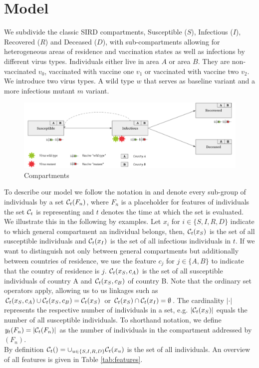 \section{Model}
We subdivide the classic SIRD compartments, Susceptible ($S$), Infectious ($I$), Recovered ($R$) and Deceased ($D$), with sub-compartments allowing for heterogeneous areas of residence and vaccination states as well as infections by different virus types. Individuals either live in area $A$ or area $B$. They are non-vaccinated $v_0$, vaccinated with vaccine one $v_1$ or vaccinated with vaccine two $v_2$. We introduce two virus types. A wild type $w$ that serves as baseline variant and a more infectious mutant $m$ variant.
\begin{figure}[h!]
\centering
\includegraphics[scale=0.23]{images/vaccination_pp.png}
\caption{Compartments }
\end{figure}
To describe our model we follow the notation in \cite{Waites.2021} and denote every sub-group of individuals by a set $\mathcal{C}_t(F_n)$, where $F_n$ is a placeholder for features of individuals the set $\mathcal{C}_t$ is representing and $t$ denotes the time at which the set is evaluated. We illustrate this in the following by examples. Let $x_i$ for $i \in \{S, I, R, D \}$ indicate to which general compartment an individual belongs, then, $\mathcal{C}_t(x_S)$ is the set of all susceptible individuals and $\mathcal{C}_t(x_I)$ is the set of all infectious individuals in $t$. If we want to distinguish not only between general compartments but additionally between countries of residence, we use the feature $c_j$ for $j \in \{A, B\}$ to indicate that the country of residence is $j$. $\mathcal{C}_t(x_S, c_A)$ is the set of all susceptible individuals of country A and $\mathcal{C}_t(x_S, c_B)$ of country B. Note that the ordinary set operators apply, allowing us to us linkages such as $\mathcal{C}_t(x_S, c_A) \cup \mathcal{C}_t(x_S, c_B) = \mathcal{C}_t(x_S)$ or $\mathcal{C}_t(x_S) \cap \mathcal{C}_t(x_I) = \emptyset$. The cardinality $|\cdot|$ represents the respective number of individuals in a set, e.g. $|\mathcal{C}_t(x_S)|$ equals the number of all susceptible individuals. To shorthand notation, we define $y_t(F_n) = |\mathcal{C}_t(F_n)|$ as the number of individuals in the compartment addressed by $(F_n)$. \\ By definition $\mathcal{C}_t() = \cup_{u \in \{ S, I, R,D\}} \mathcal{C}_t(x_u)$ is the set of all individuals. An overview of all features is given in Table \ref{tab:features}. 


